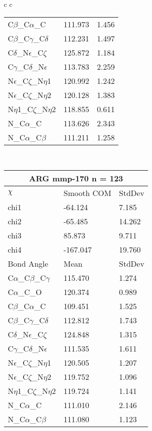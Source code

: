 \begin{longtable}{ c c }
\begin{tabular}{ l l l }
  C$\beta$\_C$\alpha$\_C & 111.973 & 1.456\\
  C$\beta$\_C$\gamma$\_C$\delta$ & 112.231 & 1.497\\
  C$\delta$\_N$\epsilon$\_C$\zeta$ & 125.872 & 1.184\\
  C$\gamma$\_C$\delta$\_N$\epsilon$ & 113.783 & 2.259\\
  N$\epsilon$\_C$\zeta$\_N$\eta$1 & 120.992 & 1.242\\
  N$\epsilon$\_C$\zeta$\_N$\eta$2 & 120.128 & 1.383\\
  N$\eta$1\_C$\zeta$\_N$\eta$2 & 118.855 & 0.611\\
  N\_C$\alpha$\_C & 113.626 & 2.343\\
  N\_C$\alpha$\_C$\beta$ & 111.211 & 1.258\\
  \bottomrule
  \end{tabular}
  \\
  \begin{tabular}{ l l l }
  \toprule
  \multicolumn{3}{c}{ARG \textbf{mmp-170} n = 123} \\ \toprule
  $\chi$       & Smooth COM & StdDev \\ \midrule
  chi1 & -64.124 & 7.185 \\ 
  chi2 & -65.485 & 14.262 \\ 
  chi3 & 85.873 & 9.711 \\ 
  chi4 & -167.047 & 19.760 \\ \midrule
  Bond Angle   & Mean     & StdDev \\ \midrule
  C$\alpha$\_C$\beta$\_C$\gamma$ & 115.470 & 1.274\\
  C$\alpha$\_C\_O & 120.374 & 0.989\\
  C$\beta$\_C$\alpha$\_C & 109.451 & 1.525\\
  C$\beta$\_C$\gamma$\_C$\delta$ & 112.812 & 1.743\\
  C$\delta$\_N$\epsilon$\_C$\zeta$ & 124.848 & 1.315\\
  C$\gamma$\_C$\delta$\_N$\epsilon$ & 111.535 & 1.611\\
  N$\epsilon$\_C$\zeta$\_N$\eta$1 & 120.505 & 1.207\\
  N$\epsilon$\_C$\zeta$\_N$\eta$2 & 119.752 & 1.096\\
  N$\eta$1\_C$\zeta$\_N$\eta$2 & 119.724 & 1.141\\
  N\_C$\alpha$\_C & 111.010 & 2.146\\
  N\_C$\alpha$\_C$\beta$ & 111.080 & 1.123\\
  \bottomrule
  \end{tabular}

\end{longtable}
